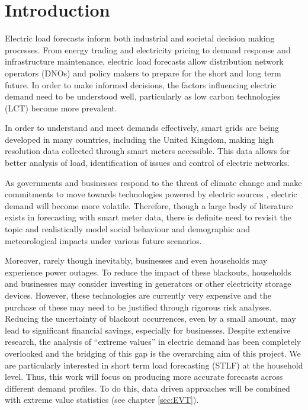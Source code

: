 
\chapter{Introduction}

Electric load forecasts inform both industrial and societal decision making processes. From energy trading and electricity pricing to demand response and infrastructure maintenance,  electric load forecasts allow distribution network operators (DNOs) and policy makers to prepare for the short and long term future. In order to make informed decisions, the factors influencing electric demand need to be understood well, particularly as low carbon technologies (LCT) become more prevalent. 

In order to understand and meet demands effectively, smart grids are being developed in many countries, including the United Kingdom, making high resolution data collected through smart meters accessible. This data allows for better analysis of load, identification of issues and control of electric networks. 

As governments and businesses respond to the threat of climate change and make commitments to move towards technologies powered by electric sources \citep{fuelban}, electric demand will become more volatile. Therefore, though a large body of literature exists in forecasting with smart meter data, there is definite need to revisit the topic and realistically model social behaviour and demographic and meteorological impacts under various future scenarios.

Moreover, rarely though inevitably, businesses and even households may experience power outages. To reduce the impact of these blackouts, households and businesses may consider investing in generators or other electricity storage devices. However, these technologies are currently very expensive and the purchase of these may need to be justified through rigorous risk analyses. Reducing the uncertainty of blackout occurrences, even by a small amount, may lead to significant financial savings, especially for businesses. Despite extensive research, the analysis of ``extreme values'' in electric demand has been completely overlooked and the bridging of this gap is the overarching aim of this project. We are particularly interested in short term load forecasting (STLF) at the household level. Thus, this work will focus on producing more accurate forecasts across different demand profiles. To do this, data driven approaches will be combined with extreme value statistics (see chapter \ref{sec:EVT}).

